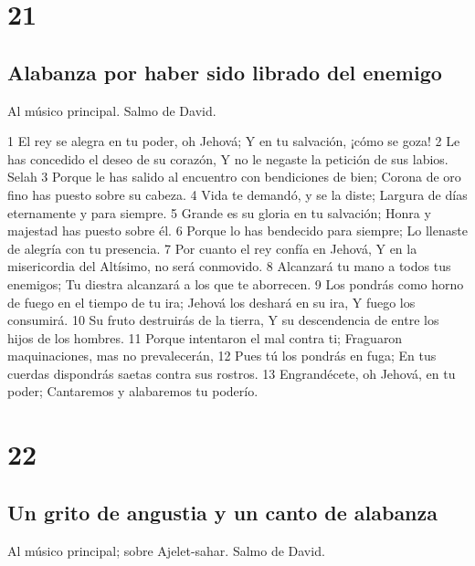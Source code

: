 \chapter{21}

\section*{Alabanza por haber sido librado del enemigo}

Al músico principal. Salmo de David.

1 El rey se alegra en tu poder, oh Jehová;
Y en tu salvación, ¡cómo se goza!
2 Le has concedido el deseo de su corazón,
Y no le negaste la petición de sus labios. Selah
3 Porque le has salido al encuentro con bendiciones de bien;
Corona de oro fino has puesto sobre su cabeza.
4 Vida te demandó, y se la diste;
Largura de días eternamente y para siempre.
5 Grande es su gloria en tu salvación;
Honra y majestad has puesto sobre él.
6 Porque lo has bendecido para siempre;
Lo llenaste de alegría con tu presencia.
7 Por cuanto el rey confía en Jehová,
Y en la misericordia del Altísimo, no será conmovido.
8 Alcanzará tu mano a todos tus enemigos;
Tu diestra alcanzará a los que te aborrecen.
9 Los pondrás como horno de fuego en el tiempo de tu ira;
Jehová los deshará en su ira,
Y fuego los consumirá.
10 Su fruto destruirás de la tierra,
Y su descendencia de entre los hijos de los hombres.
11 Porque intentaron el mal contra ti;
Fraguaron maquinaciones, mas no prevalecerán,
12 Pues tú los pondrás en fuga;
En tus cuerdas dispondrás saetas contra sus rostros.
13 Engrandécete, oh Jehová, en tu poder;
Cantaremos y alabaremos tu poderío.

\chapter{22}

\section*{Un grito de angustia y un canto de alabanza}

Al músico principal; sobre Ajelet-sahar. Salmo de David.

